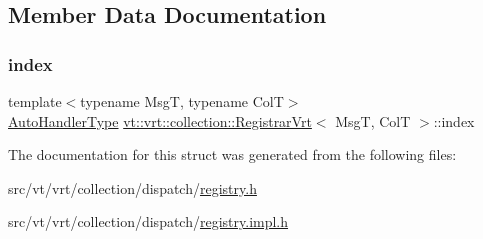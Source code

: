 \subsection{Member Data Documentation}
\mbox{\label{structvt_1_1vrt_1_1collection_1_1_registrar_vrt_a692b1c21f096657dbbc856d91cf178f0}} 
\subsubsection{\texorpdfstring{index}{index}}
{\footnotesize\ttfamily template$<$typename MsgT, typename ColT$>$ \\
\hyperlink{namespacevt_1_1vrt_1_1collection_af50831782f9d77f86d626f858f295c37}{Auto\+Handler\+Type} \hyperlink{structvt_1_1vrt_1_1collection_1_1_registrar_vrt}{vt\+::vrt\+::collection\+::\+Registrar\+Vrt}$<$ MsgT, ColT $>$\+::index}



The documentation for this struct was generated from the following files\+:\begin{DoxyCompactItemize}
\item 
src/vt/vrt/collection/dispatch/\hyperlink{vrt_2collection_2dispatch_2registry_8h}{registry.\+h}\item 
src/vt/vrt/collection/dispatch/\hyperlink{vrt_2collection_2dispatch_2registry_8impl_8h}{registry.\+impl.\+h}\end{DoxyCompactItemize}
